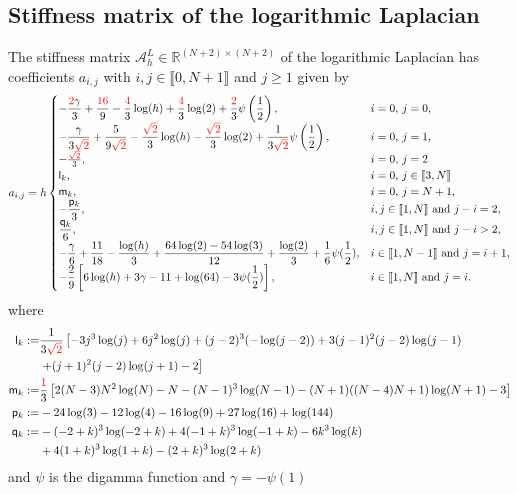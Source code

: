 \documentclass[10 pt]{article}
\newcommand\inter[1]{\llbracket #1\rrbracket}
\numberwithin{equation}{section}
\def\R{\mathbb{R}}
\newcommand{\B}[1]{{\color{red} #1}}  %
\begin{document}
\subsection{Stiffness matrix of the logarithmic Laplacian}\label{sec:s:m:log}

The stiffness matrix $\mathcal A_{h}^{L}\in{\R^{(N+2)\times(N+2)}}$ of the logarithmic Laplacian has coefficients $a_{i,j}$ with $i,j\in\inter{0,N+1}$ and $j\geq 1$ given by
%
\begin{equation}\label{stiff:LogLap}
a_{i,j}= h
\begin{cases}
\displaystyle -\frac{\B{2} \gamma }{3}+\frac{\B{16}}{9}-\frac{\B{4}}{3}  \log (h)+\frac{\B{4}}{3}  \log
   (2)+\frac{\B{2}}{3}  \psi \left(\frac{1}{2}\right), & \textnormal{$i=0$, $j=0$,} \\
\displaystyle -\frac{\gamma }{3\B{\sqrt{2}}}+\frac{5}{9\B{\sqrt{2}}}-\frac{\B{\sqrt{2}}}{3} \log (h)-\frac{\B{\sqrt{2}}}{3}  \log
   (2)+\frac{1}{3\B{\sqrt{2}}} \psi \left(\frac{1}{2}\right), & \textnormal{$i=0$, $j=1$,} \\
   -\frac{\B{\sqrt {2}}}{3},
 & \parbox[t]{.3\columnwidth}{$i=0$, $j=2$}\\
 \mathsf{l}_k, 
 & \parbox[t]{.3\columnwidth}{$i=0$, $j\in\inter{3,N}$}\\
 \mathsf{m}_k, &  \parbox[t]{.3\columnwidth}{$i=0$, $j=N+1$,}\\
\displaystyle -\frac{\mathsf p_k}{3}, & \textnormal{$i,j\in\inter{1,N}$ and $j-i=2$,} \\
\displaystyle \frac{\mathsf q_k}{6}, & \textnormal{$i,j\in\inter{1,N}$ and $j-i> 2$,} \\
\displaystyle -\frac{\gamma}{6} + \frac{11}{18} - \frac{\log(h)}{3}  + \frac{64\log(2) - 54\log(3)}{12} + \frac{\log(2)}{3}  + \frac{1}{6} \psi(\frac 12), & \textnormal{$i\in\inter{1,N-1}$ and $j=i+1$,} \\
\displaystyle -\frac{2}{9}\left[6\log(h) + 3\gamma - 11 + \log(64) - 3\psi(\frac12)\right], & \textnormal{$i\in\inter{1,N}$ and $j=i$.}
\end{cases}
\end{equation}
%
where 
%
\begin{align} \notag
\mathsf{l}_k:= & \frac{1}{3\B{\sqrt{2}}}  \left[-3 j^3 \log (j)+6 j^2 \log (j)+(j-2)^3 (-\log (j-2))+3
   (j-1)^2 (j-2) \log (j-1) \right. \\
   &\left. +(j+1)^2 (j-2) \log (j+1)-2\right] \\
   \mathsf{m}_k:= & \frac{\B{1}}{3}\left[2 (N-3) N^2 \log (N)-N-(N-1)^3 \log (N-1)-(N+1) ((N-4) N+1) \log (N+1)-3\right] \\
\mathsf{p}_k:=&  -24\log(3) - 12\log(4) - 16\log(9) + 27\log(16) + \log(144) \\ \notag
\mathsf{q}_k:=&-(-2 + k)^3\log(-2 + k) + 4(-1 + k)^3\log(-1 + k) - 6 k^3 \log(k)  \\
&+4(1 + k)^3\log(1 + k) - (2 + k)^3\log(2 + k)
\end{align}
and $\psi$ is the digamma function and $\gamma=-\psi(1)$
\end{document}
